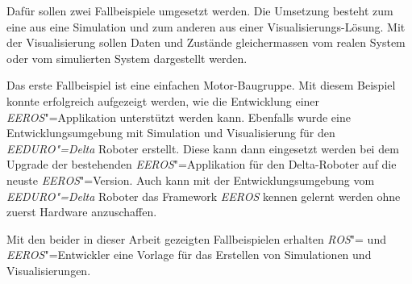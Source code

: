 Dafür sollen zwei Fallbeispiele umgesetzt werden.
Die Umsetzung besteht zum eine aus eine Simulation und zum anderen aus einer Visualisierungs-Lösung.
Mit der Visualisierung sollen Daten und Zustände gleichermassen vom realen System oder vom simulierten System dargestellt werden.


Das erste Fallbeispiel ist eine einfachen Motor-Baugruppe.
Mit diesem Beispiel konnte erfolgreich aufgezeigt werden, wie die Entwicklung einer \textit{EEROS}"=Applikation unterstützt werden kann.
Ebenfalls wurde eine Entwicklungsumgebung mit Simulation und Visualisierung für den \textit{EEDURO"=Delta} Roboter erstellt.
Diese kann dann eingesetzt werden bei dem Upgrade der bestehenden \textit{EEROS}"=Applikation für den Delta-Roboter auf die neuste \textit{EEROS}"=Version.
Auch kann mit der Entwicklungsumgebung vom \textit{EEDURO"=Delta} Roboter das Framework \textit{EEROS} kennen gelernt werden ohne zuerst Hardware anzuschaffen.


Mit den beider in dieser Arbeit gezeigten Fallbeispielen erhalten \textit{ROS}"= und \textit{EEROS}"=Entwickler eine Vorlage für das Erstellen von Simulationen und Visualisierungen.

